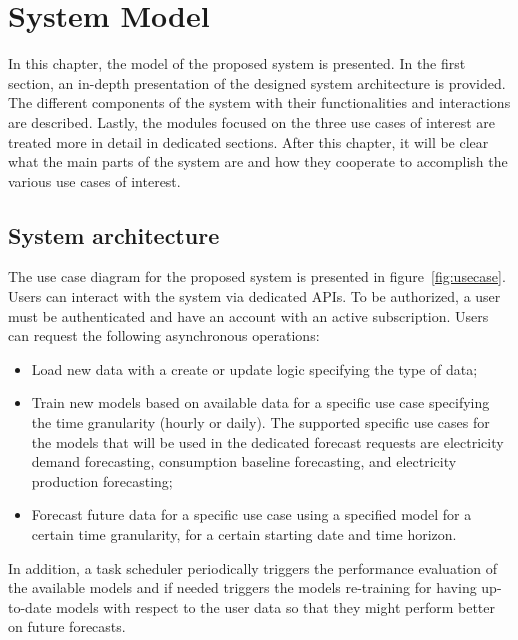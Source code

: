\chapter{System Model}
\label{cha:system}
\vspace{0.4 cm}

In this chapter, the model of the proposed system is presented.
In the first section, an in-depth presentation of the designed system architecture is provided.
The different components of the system with their functionalities and interactions are described.
Lastly, the modules focused on the three use cases of interest are treated more in detail in dedicated sections.
After this chapter, it will be clear what the main parts of the system are and how they cooperate to accomplish the various use cases of interest.


\section{System architecture}
\label{sec:architecture}
\vspace{0.2 cm}

The use case diagram for the proposed system is presented in figure~\ref{fig:usecase}.
Users can interact with the system via dedicated APIs.
To be authorized, a user must be authenticated and have an account with an active subscription.
Users can request the following asynchronous operations:
\begin{itemize}
  \item Load new data with a create or update logic specifying the type of data;
  \item Train new models based on available data for a specific use case specifying the time granularity (hourly or daily). The supported specific use cases for the models that will be used in the dedicated forecast requests are electricity demand forecasting, consumption baseline forecasting, and electricity production forecasting;
  \item Forecast future data for a specific use case using a specified model for a certain time granularity, for a certain starting date and time horizon.
\end{itemize}

In addition, a task scheduler periodically triggers the performance evaluation of the available models and if needed triggers the models re-training for having up-to-date models with respect to the user data so that they might perform better on future forecasts.

